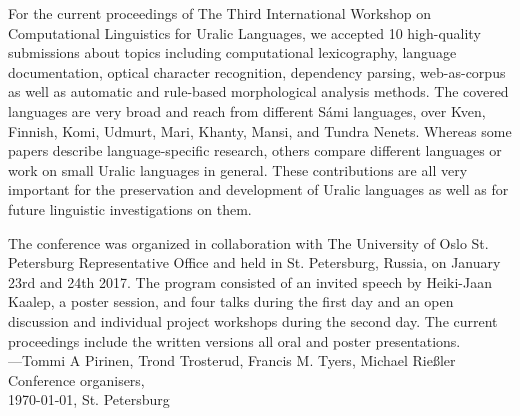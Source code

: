 \documentclass[11pt]{article}
\begin{document}
For the current proceedings of The Third International Workshop on Computational
Linguistics for Uralic Languages, we accepted 10 high-quality submissions about
topics including computational lexicography, language documentation, optical
character recognition, dependency parsing, web-as-corpus as well as automatic
and rule-based morphological analysis methods. The covered languages are very
broad and reach from different S\'{a}mi languages, over Kven, Finnish, Komi, Udmurt,
Mari, Khanty, Mansi, and Tundra Nenets. Whereas some papers describe
language-specific research, others compare different languages or work on small
Uralic languages in general. These contributions are all very important for the
preservation and development of Uralic languages as well as for future
linguistic investigations on them.

The conference was organized in collaboration with The University of Oslo St.
Petersburg Representative Office and held in St. Petersburg, Russia, on January
23rd and 24th 2017.  The program consisted of an invited speech by Heiki-Jaan
Kaalep, a poster session, and four  talks during the first day and an open
discussion and individual project workshops during the second day.  The current
proceedings include the written versions all oral and poster presentations.\\

\noindent ---Tommi A Pirinen, Trond Trosterud, Francis M. Tyers, Michael Rie\ss ler\\
Conference organisers,\\
\today, St. Petersburg
\end{document}
